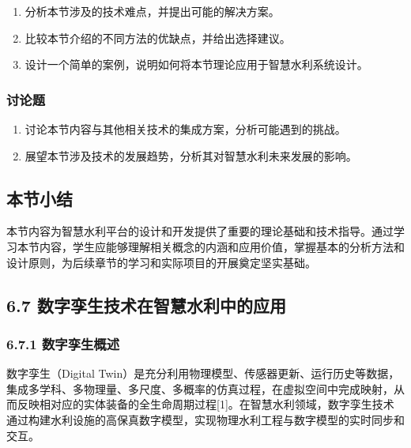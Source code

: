 \begin{enumerate}
\def\labelenumi{\arabic{enumi}.}
\tightlist
\item
  分析本节涉及的技术难点，并提出可能的解决方案。
\item
  比较本节介绍的不同方法的优缺点，并给出选择建议。
\item
  设计一个简单的案例，说明如何将本节理论应用于智慧水利系统设计。
\end{enumerate}

\hypertarget{ux8ba8ux8bbaux9898-6}{%
\subsubsection{讨论题}\label{ux8ba8ux8bbaux9898-6}}

\begin{enumerate}
\def\labelenumi{\arabic{enumi}.}
\tightlist
\item
  讨论本节内容与其他相关技术的集成方案，分析可能遇到的挑战。
\item
  展望本节涉及技术的发展趋势，分析其对智慧水利未来发展的影响。
\end{enumerate}

\hypertarget{ux672cux8282ux5c0fux7ed3-5}{%
\subsection{本节小结}\label{ux672cux8282ux5c0fux7ed3-5}}

本节内容为智慧水利平台的设计和开发提供了重要的理论基础和技术指导。通过学习本节内容，学生应能够理解相关概念的内涵和应用价值，掌握基本的分析方法和设计原则，为后续章节的学习和实际项目的开展奠定坚实基础。

\hypertarget{ux6570ux5b57ux5b6aux751fux6280ux672fux5728ux667aux6167ux6c34ux5229ux4e2dux7684ux5e94ux7528}{%
\subsection{6.7 数字孪生技术在智慧水利中的应用}\label{ux6570ux5b57ux5b6aux751fux6280ux672fux5728ux667aux6167ux6c34ux5229ux4e2dux7684ux5e94ux7528}}

\hypertarget{ux6570ux5b57ux5b6aux751fux6982ux8ff0}{%
\subsubsection{6.7.1 数字孪生概述}\label{ux6570ux5b57ux5b6aux751fux6982ux8ff0}}

数字孪生（Digital Twin）是充分利用物理模型、传感器更新、运行历史等数据，集成多学科、多物理量、多尺度、多概率的仿真过程，在虚拟空间中完成映射，从而反映相对应的实体装备的全生命周期过程{[}1{]}。在智慧水利领域，数字孪生技术通过构建水利设施的高保真数字模型，实现物理水利工程与数字模型的实时同步和交互。

